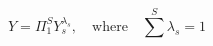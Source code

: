 \begin{equation}
    Y = \Pi_1^S Y_s^{\lambda_s}, \quad \text{where} \quad \sum^S \lambda_s = 1
\end{equation}